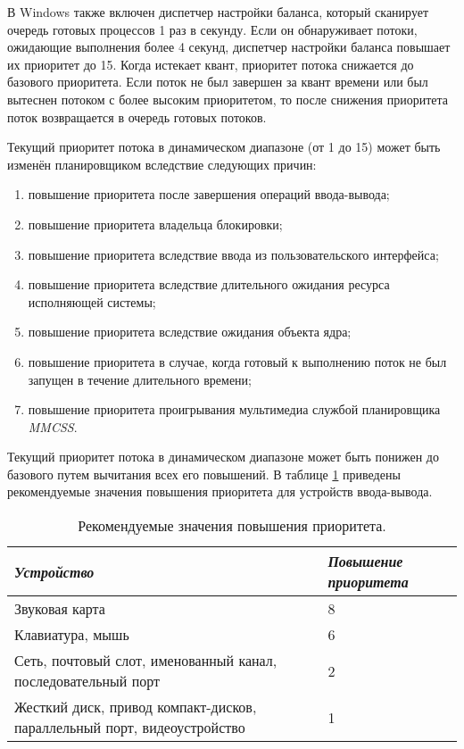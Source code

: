 В Windows также включен диспетчер настройки баланса, который сканирует очередь готовых процессов 1 раз в секунду. 
Если он обнаруживает потоки, ожидающие выполнения более 4
секунд, диспетчер настройки баланса повышает их приоритет до 15. Когда истекает
квант, приоритет потока снижается до базового приоритета. Если поток не был завершен за квант времени или был вытеснен потоком с более высоким приоритетом, то
после снижения приоритета поток возвращается в очередь готовых потоков.

Текущий приоритет потока в динамическом диапазоне (от 1 до 15) может быть изменён планировщиком вследствие следующих причин:
\begin{enumerate}
    \item повышение приоритета после завершения операций ввода-вывода;
    \item повышение приоритета владельца блокировки;
    \item повышение приоритета вследствие ввода из пользовательского интерфейса;
    \item повышение приоритета вследствие длительного ожидания ресурса исполняющей системы;
    \item повышение приоритета вследствие ожидания объекта ядра;
    \item повышение приоритета в случае, когда готовый к выполнению поток не был запущен в течение длительного времени;
    \item повышение приоритета проигрывания мультимедиа службой планировщика \textit{MMCSS}.
\end{enumerate}

Текущий приоритет потока в динамическом диапазоне может быть понижен до базового путем вычитания всех его повышений. В таблице \ref{tab:io} 
приведены рекомендуемые значения повышения приоритета для устройств ввода-вывода.

\begin{table}[h!]
    \caption{Рекомендуемые значения повышения приоритета.}
    \begin{center}
        \begin{tabular}{|p{100mm}|l|}
            \hline
            \textit{Устройство} & \textit{Повышение приоритета} \\
            \hline
            Звуковая карта & 8 \\
            \hline
            Клавиатура, мышь & 6 \\
            \hline
            Сеть, почтовый слот, именованный канал, последовательный порт & 2 \\
            \hline
            Жесткий диск, привод компакт-дисков, параллельный порт, видеоустройство & 1 \\
            \hline
        \end{tabular}
    \end{center}
    \label{tab:io}
\end{table}

